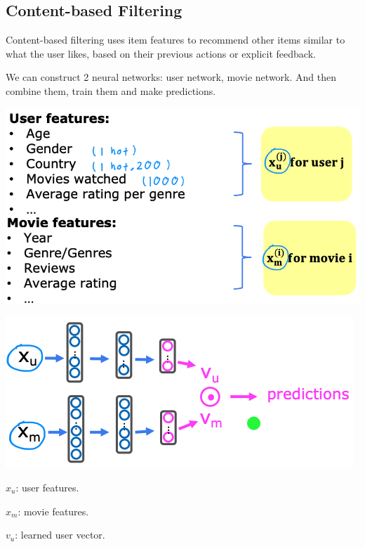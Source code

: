 \documentclass{article}
\begin{document}
\subsection{Content-based Filtering}

\noindent Content-based filtering uses item features to recommend other items similar to what the user likes, based on their previous actions or explicit feedback.

\bigskip

\noindent We can construct 2 neural networks: user network, movie network. And then combine them, train them and make predictions.

\begin{center}
\includegraphics[scale=0.4]{./images/content_based_filtering_data.png}
\end{center}

\begin{center}
\includegraphics[scale=0.5]{./images/content_based_filtering_nn.png}
\end{center}

\noindent \(x_{u}\): user features.

\noindent \(x_{m}\): movie features.

\noindent \(v_{u}\): learned user vector.
\end{document}
